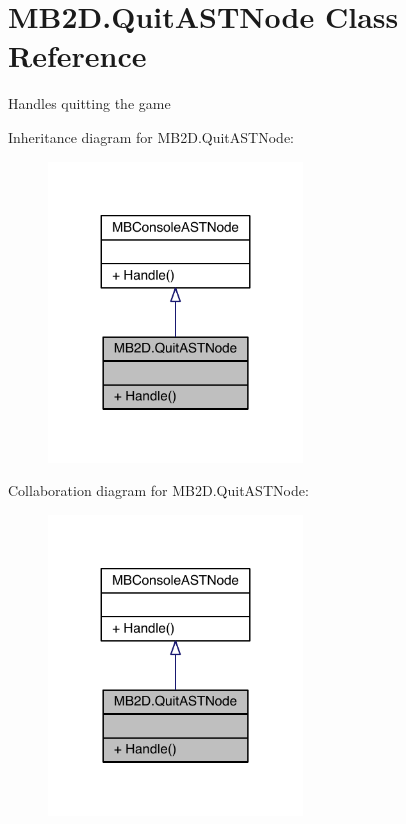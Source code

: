 \hypertarget{class_m_b2_d_1_1_quit_a_s_t_node}{}\section{M\+B2\+D.\+Quit\+A\+S\+T\+Node Class Reference}
\label{class_m_b2_d_1_1_quit_a_s_t_node}


Handles quitting the game  




Inheritance diagram for M\+B2\+D.\+Quit\+A\+S\+T\+Node\+:
\nopagebreak
\begin{figure}[H]
\begin{center}
\leavevmode
\includegraphics[width=191pt]{class_m_b2_d_1_1_quit_a_s_t_node__inherit__graph}
\end{center}
\end{figure}


Collaboration diagram for M\+B2\+D.\+Quit\+A\+S\+T\+Node\+:
\nopagebreak
\begin{figure}[H]
\begin{center}
\leavevmode
\includegraphics[width=191pt]{class_m_b2_d_1_1_quit_a_s_t_node__coll__graph}
\end{center}
\end{figure}
